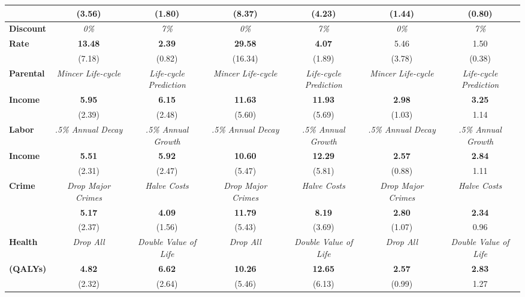 \begin{tabular}{>{\bfseries}lcc|cc|cc}
	&	(3.56)	&	(1.80)	&	(8.37)	&	(4.23)	&	(1.44)	&	(0.80)	\\ \midrule
Discount 	&	\textit{0\%}	&	\textit{7\%}	&	\textit{0\%}	&	\textit{7\%}	&	\textit{0\%}	&	\textit{7\%}	\\
Rate	&	\textbf{13.48}	&	\textbf{2.39}	&	\textbf{29.58}	&	\textbf{4.07}	&	5.46	&	1.50	\\
	&	(7.18)	&	(0.82)	&	(16.34)	&	(1.89)	&	(3.78)	&	(0.38)	\\ \midrule
Parental	&	\textit{Mincer Life-cycle}	&	\textit{Life-cycle Prediction}	&	\textit{Mincer Life-cycle}	&	\textit{Life-cycle Prediction}	&	\textit{Mincer Life-cycle}	&	\textit{Life-cycle Prediction}	\\
Income	&	\textbf{5.95}	&	\textbf{6.15}	&	\textbf{11.63}	&	\textbf{11.93}	&	\textbf{2.98}	&	\textbf{3.25}	\\
	&	(2.39)	&	(2.48)	&	(5.60)	&	(5.69)	&	(1.03)	&	1.14	\\ \midrule
Labor	&	\textit{.5\% Annual Decay}	&	\textit{.5\% Annual Growth}	&	\textit{.5\% Annual Decay}	&	\textit{.5\% Annual Growth}	&	\textit{.5\% Annual Decay}	&	\textit{.5\% Annual Growth}	\\
Income	&	\textbf{5.51}	&	\textbf{5.92}	&	\textbf{10.60}	&	\textbf{12.29}	&	\textbf{2.57}	&	\textbf{2.84}	\\
	&	(2.31)	&	(2.47)	&	(5.47)	&	(5.81)	&	(0.88)	&	1.11	\\ \midrule
Crime	&	\textit{Drop Major Crimes}	&	\textit{Halve Costs}	&	\textit{Drop Major Crimes}	&	\textit{Halve Costs}	&	\textit{Drop Major Crimes}	&	\textit{Halve Costs}	\\
	&	\textbf{5.17}	&	\textbf{4.09}	&	\textbf{11.79}	&	\textbf{8.19}	&	\textbf{2.80}	&	\textbf{2.34}	\\
	&	(2.37)	&	(1.56)	&	(5.43)	&	(3.69)	&	(1.07)	&	0.96	\\
Health	&	\textit{Drop All}	&	\textit{Double Value of Life}	&	\textit{Drop All}	&	\textit{Double Value of Life}	&	\textit{Drop All}	&	\textit{Double Value of Life}	\\
(QALYs)	&	\textbf{4.82}	&	\textbf{6.62}	&	\textbf{10.26}	&	\textbf{12.65}	&	\textbf{2.57}	&	\textbf{2.83}	\\
	&	(2.32)	&	(2.64)	&	(5.46)	&	(6.13)	&	(0.99)	&	1.27	\\ \bottomrule
\end{tabular} 